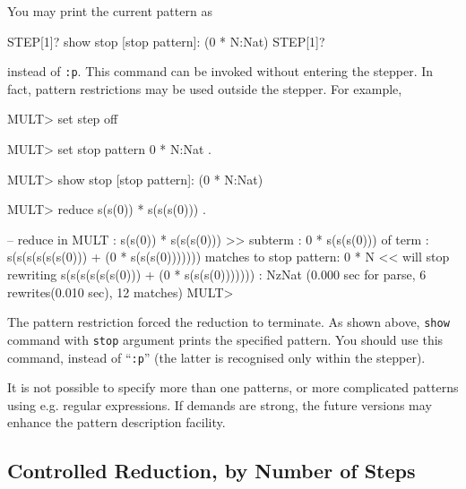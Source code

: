 \documentclass[a4paper]{memoir}
\begin{document}
You may print the current pattern as
\begin{vvtm}
\begin{ccode}
  STEP[1]? show stop
  [stop pattern]: (0 * N:Nat)
  STEP[1]? 
\end{ccode}
\end{vvtm}
instead of \verb|:p|. This command can be invoked without entering
the stepper. In fact, pattern restrictions may be used outside the
stepper. For example,
\begin{vvtm}
\begin{ccode}
  MULT> set step off

  MULT> set stop pattern 0 * N:Nat .

  MULT> show stop
  [stop pattern]: (0 * N:Nat)

  MULT> reduce s(s(0)) * s(s(s(0))) .

  -- reduce in MULT : s(s(0)) * s(s(s(0)))
  >> subterm : 0 * s(s(s(0)))
     of term : s(s(s(s(s(s(0))) + (0 * s(s(s(0)))))))
     matches to stop pattern: 0 * N
  << will stop rewriting
  s(s(s(s(s(s(0))) + (0 * s(s(s(0))))))) : NzNat
  (0.000 sec for parse, 6 rewrites(0.010 sec), 12 matches)
  MULT> 
\end{ccode}
\end{vvtm}
The pattern restriction forced the reduction to terminate.
As shown above, \verb|show| command with \verb|stop| argument prints
the specified pattern. You should use this command, instead of ``\verb|:p|''
(the latter is recognised only within the stepper).

\begin{warning}
  It is not possible to specify more than one patterns, or
  more complicated patterns using e.g. regular expressions.
  If demands are strong, the future versions may enhance
  the pattern description facility.
\end{warning}

\subsection{Controlled Reduction, by Number of Steps}
\label{sec:p2-control-reduction-limit}
\end{document}
